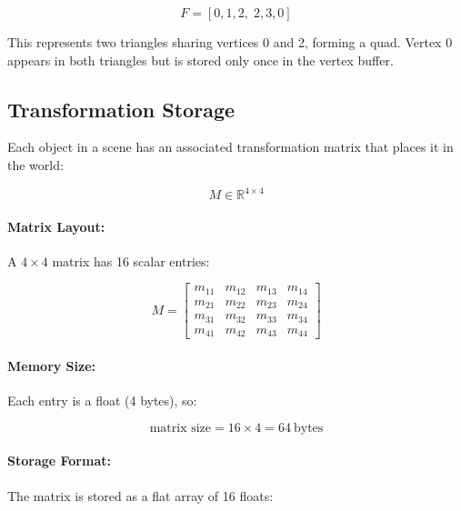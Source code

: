\documentclass[11pt]{article}
\begin{document}
\begin{equation}
    F = [0, 1, 2, \; 2, 3, 0]
\end{equation}

This represents two triangles sharing vertices 0 and 2, forming a quad. Vertex 0 appears in both triangles but is stored only once in the vertex buffer.


\subsection{Transformation Storage}

Each object in a scene has an associated transformation matrix that places it in the world:

\begin{equation}
    M \in \mathbb{R}^{4 \times 4}
\end{equation}

\paragraph{Matrix Layout:}

A $4\times 4$ matrix has 16 scalar entries:

\begin{equation}
    M =
    \begin{bmatrix}
        m_{11} & m_{12} & m_{13} & m_{14} \\
        m_{21} & m_{22} & m_{23} & m_{24} \\
        m_{31} & m_{32} & m_{33} & m_{34} \\
        m_{41} & m_{42} & m_{43} & m_{44}
    \end{bmatrix}
\end{equation}

\paragraph{Memory Size:}

Each entry is a float (4 bytes), so:

\begin{equation}
    \text{matrix size} = 16 \times 4 = 64\ \text{bytes}
\end{equation}

\paragraph{Storage Format:}

The matrix is stored as a flat array of 16 floats:
\end{document}
